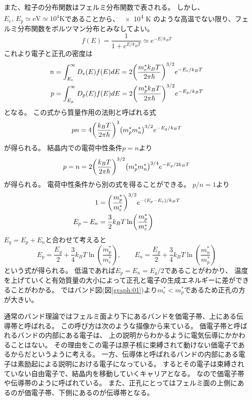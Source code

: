 \documentclass[11pt,dvipdfmx,a4paper]{jsarticle}
\numberwithin{equation}{section}
\begin{document}
また、粒子の分布関数はフェルミ分布関数で表される。
しかし、\(E_e,\, E_p \simeq \text{eV} \simeq 10^4 \text{K}\)であることから、
\num{e4} K のような高温でない限り、フェルミ分布関数をボルツマン分布とみなしてよい。
\begin{equation}
	f(E) = \frac{1}{1+e^{E/k_BT}} \simeq e^{-E/k_BT}
\end{equation}
これより電子と正孔の密度は
\begin{align}
	n &= \int_{E_e}^\infty D_e(E) f(E) dE = 2\qty(\frac{m_e^*k_BT}{2\pi\hbar})^{3/2}e^{-E_e/k_BT}\\
	p &= \int_{E_p}^\infty D_p(E) f(E) dE = 2\qty(\frac{m_p^*k_BT}{2\pi\hbar})^{3/2}e^{-E_p/k_BT}
\end{align}
となる。
この式から質量作用の法則と呼ばれる式
\begin{equation}
	pn = 4\qty(\frac{k_B T}{2\pi\hbar})^3\qty(m_p^*m_n^*)^{3/2} e^{-E_g/k_BT}
\end{equation}
が得られる。
結晶内での電荷中性条件\(p=n\)より
\begin{equation}
	p=n=2\qty(\frac{k_B T}{2\pi\hbar})^{3/2}\qty(m_p^*m_n^*)^{3/4} e^{-E_g/2k_BT} \label{eq:5-9}
\end{equation}
が得られる。
電荷中性条件から別の式を得ることができる。
\(p/n=1\)より
\begin{align}
	1 &= \qty(\frac{m_p^*}{m_e^*})^{3/2}e^{-(E_p-E_c)/k_BT}\\
	E_p - E_n &= \frac{3}{2}k_BT\ln(\frac{m_p^*}{m_e^*})
\end{align}
\(E_g = E_p + E_n\)と合わせて考えると
\begin{equation}
	E_p = \frac{E_g}{2} + \frac{3}{4}k_BT\ln(\frac{m_p^*}{m_e^*}), \qquad
	E_n = \frac{E_g}{2} + \frac{3}{4}k_BT\ln(\frac{m_n^*}{m_p^*})
\end{equation}
という式が得られる。
低温であれば\(E_p=E_n=E_g/2\)であることがわかり、
温度を上げていくと有効質量の大小によって正孔と電子の生成エネルギーに差ができることがわかる。
ではバンド図(図\ref{graph:01})より\(m_e^* < m_p^*\)であるため正孔の方が大きい。

通常のバンド理論ではフェルミ面より下にあるバンドを価電子帯、上にある伝導帯と呼ばれる。
この呼び方は次のような描像から来ている。
価電子帯と呼ばれるバンドの内部にある電子は、
上の説明からわかるように電気伝導にかかわることはない。
その理由をこの電子は原子核に束縛されて動けない価電子であるからだというように考える。
一方、伝導体と呼ばれるバンドの内部にある電子は素励起による説明における電子になっている。
するとその電子は束縛されていない自由電子で、結晶内を移動していくキャリアとなる。
なので価電子帯や伝導帯のように呼ばれている。
また、正孔にとってはフェルミ面の上側にあるのが価電子帯、下側にあるのが伝導帯となる。
\end{document}
